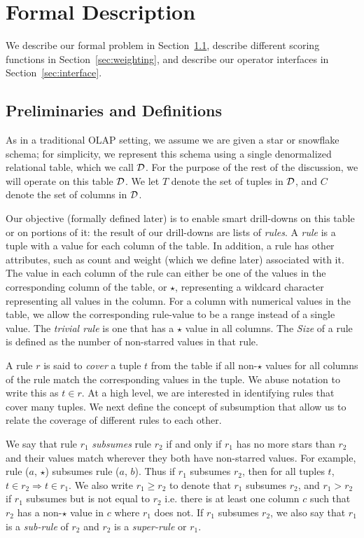 

\section{Formal Description}\label{sec:formal}
We describe our formal problem
in Section~\ref{sec:preliminaries},
describe different scoring functions
in Section~\ref{sec:weighting},
and describe our operator interfaces
in Section~\ref{sec:interface}. 
\subsection{Preliminaries and Definitions}
\label{sec:preliminaries}

 As in a traditional OLAP setting, we assume we are given a 
star or snowflake schema;
for simplicity, we represent this schema using a single denormalized relational table,
which we call $\mathcal{D}$. 
For the purpose of the rest of the discussion, we will operate on this
table $\mathcal{D}$.
We let $T$ denote the set of tuples in $\mathcal{D}$, and $C$ denote 
the set of columns in $\mathcal{D}$.

Our objective (formally defined later) is to 
enable smart drill-downs on this table or on portions of it:
the result of our drill-downs are lists of {\em rules}. 
A {\em rule} is a tuple with a value for each column of the table. 
In addition, a rule has other attributes, such as count and weight 
(which we define later) associated with it. 
The value in each column of the rule can either be one of the values in the corresponding column of the table, or $\star$, representing a wildcard character representing all values in the column. For a column with numerical values in the table, we allow the corresponding rule-value to be a range instead of a single value. The {\em trivial rule} is one that has a $\star$ value in all columns. The {\em Size} of a rule is defined as the number of non-starred values in that rule.

 A rule $r$ is said to {\em cover} a tuple  $t$ from the table if all non-$\star$ values for all columns of the rule match the corresponding values in the tuple. We abuse notation to write this as $t \in r$. At a high level, we are interested
in identifying rules that cover many tuples. We next define the concept of subsumption that allow us to 
relate the coverage of different rules to each other.

We say that rule $r_1$ {\em subsumes} rule $r_2$ if and only if $r_1$ has no more stars than $r_2$ and their values match wherever they both have non-starred values. For example, rule ($a$, $\star$) subsumes rule ($a$, $b$). Thus if $r_1$ subsumes $r_2$, then for all tuples $t$, $t \in r_2 \Rightarrow t \in r_1$. We also write $r_1 \geq r_2$ to denote that $r_1$ subsumes $r_2$, and $r_1 > r_2$ if $r_1$ subsumes but is not equal to $r_2$ i.e. there is at least one column $c$ such that $r_2$ has a non-$\star$ value in $c$ where $r_1$ does not. If $r_1$ subsumes $r_2$, we also say that $r_1$ is a {\em sub-rule} of $r_2$ and $r_2$ is a {\em super-rule} or $r_1$.

